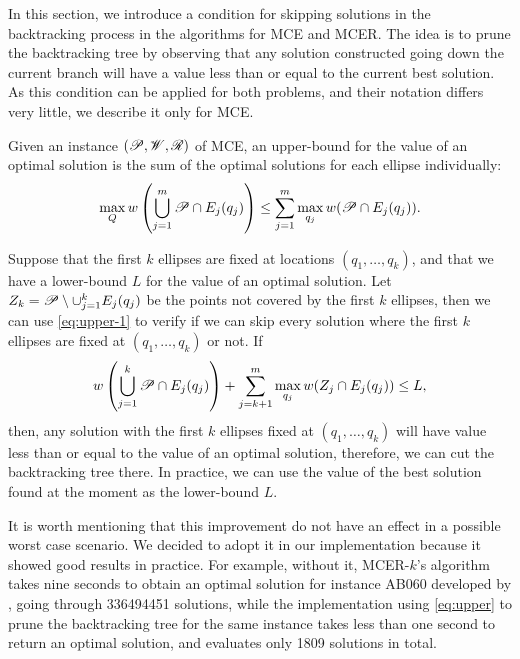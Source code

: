 In this section, we introduce a condition for skipping solutions in the backtracking process in the algorithms for MCE and MCER.
The idea is to prune the backtracking tree by observing that any solution constructed going down the current branch will have a value less than or equal to the current best solution.
As this condition can be applied for both problems, and their notation differs very little, we describe it only for MCE.

Given an instance $(\mathscr{P}, \mathscr{W}, \mathscr{R})$ of MCE, an upper-bound for the value of an optimal solution is the sum of the optimal solutions for each ellipse individually:
\begin{equation}\label{eq:upper-1}
\max_{Q} w\left(\bigcup_{j=1}^m \mathscr{P} \cap E_j(q_j)\right) \le \sum_{j=1}^m \max_{q_j} w(\mathscr{P} \cap E_j(q_j)).
\end{equation}

Suppose that the first $k$ ellipses are fixed at locations $(q_1,\dots, q_k)$, and that we have a lower-bound $L$ for the value of an optimal solution. Let $Z_k=\mathscr{P}\setminus \cup_{j=1}^k E_j(q_j)$ be the points not covered by the first $k$ ellipses, then we can use \autoref{eq:upper-1} to verify if we can skip every solution where the first $k$ ellipses are fixed at  $(q_1,\dots, q_k)$ or not.
If
\begin{equation}\label{eq:upper}
w\left(\bigcup_{j=1}^{k} \mathscr{P} \cap E_j(q_j)\right)+
\sum_{j=k+1}^m \max_{q_j} w(Z_j \cap E_j(q_j)) \le L,
\end{equation}
then, any solution with the first $k$ ellipses fixed at $(q_1,\dots, q_k)$ will have value less than or equal to the value of an optimal solution, therefore, we can cut the backtracking tree there. In practice, we can use the value of the best solution found at the moment as the lower-bound $L$.

It is worth mentioning that this improvement do not have an effect in a possible worst case scenario. We decided to adopt it in our implementation because it showed good results in practice.
For example, without it, 
MCER-$k$'s algorithm takes nine seconds to obtain an optimal solution for instance AB060 developed by \cite{andreta}, going through \num{336494451} solutions, while the implementation using \autoref{eq:upper} to prune the backtracking tree for the same instance takes less than one second to return an optimal solution, and evaluates only \num{1809} solutions in total.
